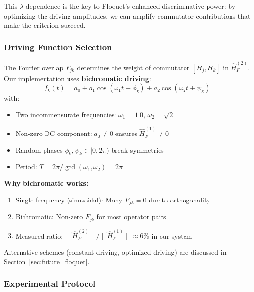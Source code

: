 This $\lambda$-dependence is the key to Floquet's enhanced discriminative power: by optimizing the driving amplitudes, we can amplify commutator contributions that make the criterion succeed.

\subsubsection{Driving Function Selection}

The Fourier overlap $F_{jk}$ determines the weight of commutator $[H_j, H_k]$ in $\hat{H}_F^{(2)}$. Our implementation uses \textbf{bichromatic driving}:
\begin{equation}
f_k(t) = a_0 + a_1 \cos(\omega_1 t + \phi_k) + a_2 \cos(\omega_2 t + \psi_k)
\end{equation}
with:
\begin{itemize}
\item Two incommensurate frequencies: $\omega_1 = 1.0$, $\omega_2 = \sqrt{2}$
\item Non-zero DC component: $a_0 \neq 0$ ensures $\hat{H}_F^{(1)} \neq 0$
\item Random phases $\phi_k, \psi_k \in [0, 2\pi)$ break symmetries
\item Period: $T = 2\pi / \gcd(\omega_1, \omega_2) = 2\pi$
\end{itemize}

\textbf{Why bichromatic works:}
\begin{enumerate}
\item Single-frequency (sinusoidal): Many $F_{jk} = 0$ due to orthogonality
\item Bichromatic: Non-zero $F_{jk}$ for most operator pairs
\item Measured ratio: $\|\hat{H}_F^{(2)}\| / \|\hat{H}_F^{(1)}\| \approx 6\%$ in our system
\end{enumerate}

Alternative schemes (constant driving, optimized driving) are discussed in Section~\ref{sec:future_floquet}.

\subsubsection{Experimental Protocol}

